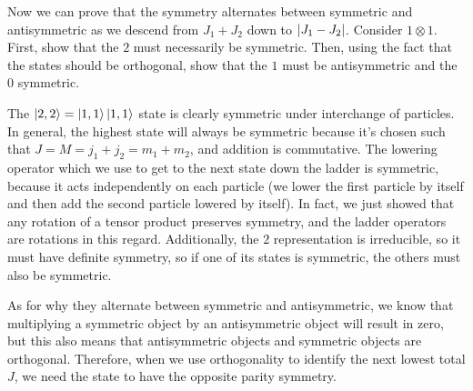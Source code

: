 \documentclass[a4paper,twoside]{article}
\begin{document}
Now we can prove that the symmetry alternates between symmetric and antisymmetric as we descend from $ J_1 + J_2 $ down to $ \abs{J_1 - J_2} $. Consider $ 1 \otimes 1 $. First, show that the $ 2 $ must necessarily be symmetric. Then, using the fact that the states should be orthogonal, show that the $ 1 $ must be antisymmetric and the $ 0 $ symmetric.

\begin{problem}
    The $\ket{2,2} =\ket{1,1}\ket{1,1} $ state is clearly symmetric under interchange of particles. In general, the highest state will always be symmetric because it's chosen such that $ J = M = j_1 + j_2 = m_1 + m_2 $, and addition is commutative. The lowering operator which we use to get to the next state down the ladder is symmetric, because it acts independently on each particle (we lower the first particle by itself and then add the second particle lowered by itself). In fact, we just showed that any rotation of a tensor product preserves symmetry, and the ladder operators are rotations in this regard. Additionally, the $ 2 $ representation is irreducible, so it must have definite symmetry, so if one of its states is symmetric, the others must also be symmetric.

    As for why they alternate between symmetric and antisymmetric, we know that multiplying a symmetric object by an antisymmetric object will result in zero, but this also means that antisymmetric objects and symmetric objects are orthogonal. Therefore, when we use orthogonality to identify the next lowest total $ J $, we need the state to have the opposite parity symmetry.
\end{problem}
\end{document}
